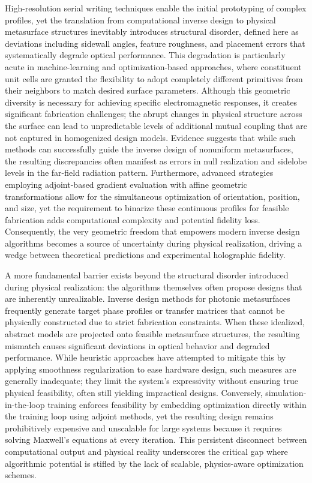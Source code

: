 \documentclass[11pt]{article}
\begin{document}
High-resolution serial writing techniques enable the initial prototyping of complex profiles, yet the translation from computational inverse design to physical metasurface structures inevitably introduces structural disorder, defined here as deviations including sidewall angles, feature roughness, and placement errors that systematically degrade optical performance. This degradation is particularly acute in machine-learning and optimization-based approaches, where constituent unit cells are granted the flexibility to adopt completely different primitives from their neighbors to match desired surface parameters. Although this geometric diversity is necessary for achieving specific electromagnetic responses, it creates significant fabrication challenges; the abrupt changes in physical structure across the surface can lead to unpredictable levels of additional mutual coupling that are not captured in homogenized design models. Evidence suggests that while such methods can successfully guide the inverse design of nonuniform metasurfaces, the resulting discrepancies often manifest as errors in null realization and sidelobe levels in the far-field radiation pattern. Furthermore, advanced strategies employing adjoint-based gradient evaluation with affine geometric transformations allow for the simultaneous optimization of orientation, position, and size, yet the requirement to binarize these continuous profiles for feasible fabrication adds computational complexity and potential fidelity loss. Consequently, the very geometric freedom that empowers modern inverse design algorithms becomes a source of uncertainty during physical realization, driving a wedge between theoretical predictions and experimental holographic fidelity. \citep{doi_10_48550_arxiv_2603_15210_fdcfb92f} \citep{doi_10_1109_tap_2021_3137496_d4a1d597}

A more fundamental barrier exists beyond the structural disorder introduced during physical realization: the algorithms themselves often propose designs that are inherently unrealizable. Inverse design methods for photonic metasurfaces frequently generate target phase profiles or transfer matrices that cannot be physically constructed due to strict fabrication constraints. When these idealized, abstract models are projected onto feasible metasurface structures, the resulting mismatch causes significant deviations in optical behavior and degraded performance. While heuristic approaches have attempted to mitigate this by applying smoothness regularization to ease hardware design, such measures are generally inadequate; they limit the system's expressivity without ensuring true physical feasibility, often still yielding impractical designs. Conversely, simulation-in-the-loop training enforces feasibility by embedding optimization directly within the training loop using adjoint methods, yet the resulting design remains prohibitively expensive and unscalable for large systems because it requires solving Maxwell's equations at every iteration. This persistent disconnect between computational output and physical reality underscores the critical gap where algorithmic potential is stifled by the lack of scalable, physics-aware optimization schemes. \citep{doi_10_48550_arxiv_2505_18377_a6fc9ec3}
\end{document}
